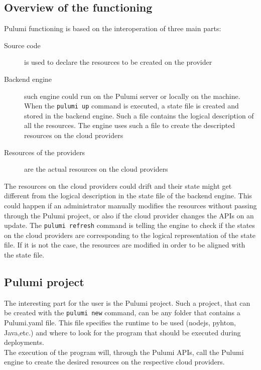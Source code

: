 \subsection{Overview of the functioning}
Pulumi functioning is based on the interoperation of three main parts:
\begin{description}
  \item[Source code] is used to declare the resources to be created on the provider
  \item[Backend engine] such engine could run on the Pulumi server or locally on the machine. When the \texttt{pulumi up} command is executed, a state file is created and stored in the backend engine. Such a file contains the logical description of all the resources. The engine uses such a file to create the descripted resources on the cloud providers
  \item[Resources of the providers] are the actual resources on the cloud providers
\end{description}
The resources on the cloud providers could drift and their state might get different from the logical description in the state file of the backend engine.
This could happen if an administrator manually modifies the resources without passing through the Pulumi project, or also if the cloud provider changes the APIs on an update.
The \texttt{pulumi refresh} command is telling the engine to check if the states on the cloud providers are corresponding to the logical representation of the state file.
If it is not the case, the resources are modified in order to be aligned with the state file.


\subsection{Pulumi project}
The interesting part for the user is the Pulumi project.
Such a project, that can be created with the \texttt{pulumi new} command, can be any folder that contains a Pulumi.yaml file.
This file specifies the runtime to be used (nodejs, pyhton, Java,etc.) and where to look for the program that should be executed during deployments.\\
The execution of the program will, through the Pulumi APIs, call the Pulumi engine to create the desired resources on the respective cloud providers.

